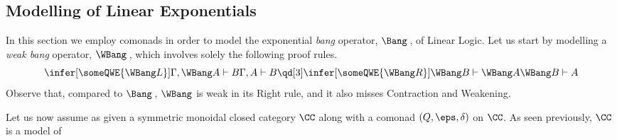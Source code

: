 \documentclass{svmult}
\begin{document}
\subsection{Modelling of Linear Exponentials}
%
In this section we employ comonads in order to model the exponential \emph{bang} operator, $\Bang$\,, of Linear Logic. Let us start by modelling
a \emph{weak bang} operator, $\WBang$\,, which involves solely the following proof rules.
\[
\infer[\someQWE{\WBang L}]{\Gamma,\WBang A\vdash B}{\Gamma,A\vdash B}\qd[3]\infer[\someQWE{\WBang R}]{\WBang B\vdash\WBang A}{\WBang B\vdash A}
\]
Observe that, compared to $\Bang$\,, $\WBang$ is weak in its Right rule, and it also misses Contraction and Weakening.

Let us now assume as given a symmetric monoidal closed category $\CC$ along with a comonad $(Q,\eps,\delta)$ on $\CC$. As seen previously, $\CC$ is a model of
\end{document}
